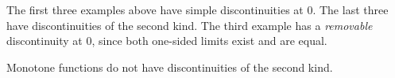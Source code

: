 The first three examples above have simple discontinuities at $0$.
The last three have discontinuities of the second kind.
The third example has a \emph{removable} discontinuity at $0$, since
both one-sided limits exist and are equal.

\begin{theorem} \label{thm:discont:monotone}
    Monotone functions do not have discontinuities of the second kind.
\end{theorem}
